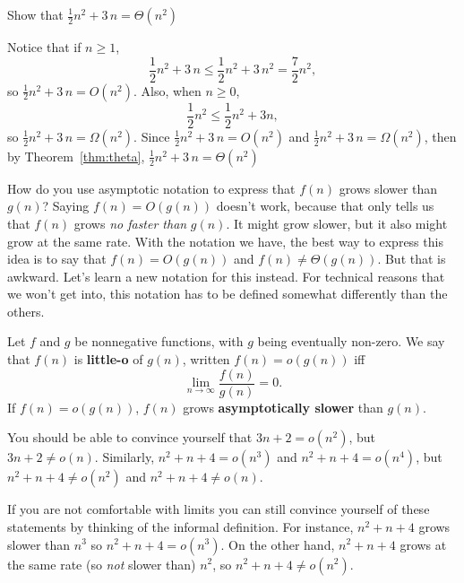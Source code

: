 \begin{exa}\label{exa:secondtheta}
Show that $\frac{1}{2} n^{2} + 3\,n=\Theta(n^{2})$
\begin{pf}
Notice that if $n\geq 1$, 
$$\frac{1}{2} n^{2}+3\,n\leq \frac{1}{2}n^{2}+3\,n^{2}=\frac{7}{ 2}n^2,$$
so  ${\displaystyle \frac{1}{2}n^2 +3\,n=O(n^2)}$.
Also, when $n\geq 0$, 
$$ \frac{1}{2}n^2 \leq \frac{1}{2}n^2 +3n,$$
so ${\displaystyle \frac{1}{2}n^2 +3\,n=\Omega(n^2)}$.
Since 
$\frac{1}{2}n^2 +3\,n=O(n^2)$ and
$\frac{1}{2}n^2 +3\,n=\Omega(n^2)$, then by Theorem~\ref{thm:theta},
${\displaystyle \frac{1}{2}n^2 +3\,n=\Theta(n^2)}$
\end{pf}
\end{exa}

How do you use asymptotic notation to express that $f(n)$ grows slower than $g(n)$?
Saying $f(n)=O(g(n))$ doesn't work, because that only tells us that $f(n)$ grows 
{\em no faster than} $g(n)$.  
It might grow slower, but it also might grow at the same rate.
With the notation we have, the best way to express this idea is to say 
that $f(n)=O(g(n))$ and $f(n)\neq \Theta(g(n))$.  
But that is awkward.  Let's learn a new notation for this instead.
For technical reasons that we won't get into, this notation has to be defined
somewhat differently than the others.

\begin{df}
Let $f$ and $g$ be nonnegative functions, with $g$ being eventually non-zero.
We say that $f(n)$ is {\bf little-o} of $g(n)$, written $f(n)=o(g(n))$ iff
$$\lim_{n\rightarrow \infty}\dfrac{f(n)}{g(n)}=0.$$ 
If $f(n)=o(g(n))$, $f(n)$ grows {\bf asymptotically slower} than $g(n)$. 
\end{df}

\vspace*{-.1in}

\begin{exa}
You should be able to convince yourself that $3n+2=o(n^2)$, but $3n+2\neq o(n)$.
Similarly, $n^2+n + 4=o(n^3)$ and $n^2+n + 4=o(n^4)$, but 
$n^2+n + 4\neq o(n^2)$ and $n^2+n + 4\neq o(n)$.

If you are not comfortable with limits you can still convince yourself of these
statements by thinking of the informal definition.  
For instance, $n^2+n + 4$ grows slower than $n^3$ so $n^2+n + 4=o(n^3)$.
On the other hand, $n^2+n + 4$ grows at the same rate (so {\em not} slower than)
$n^2$, so $n^2+n + 4\neq o(n^2)$.
\end{exa}

